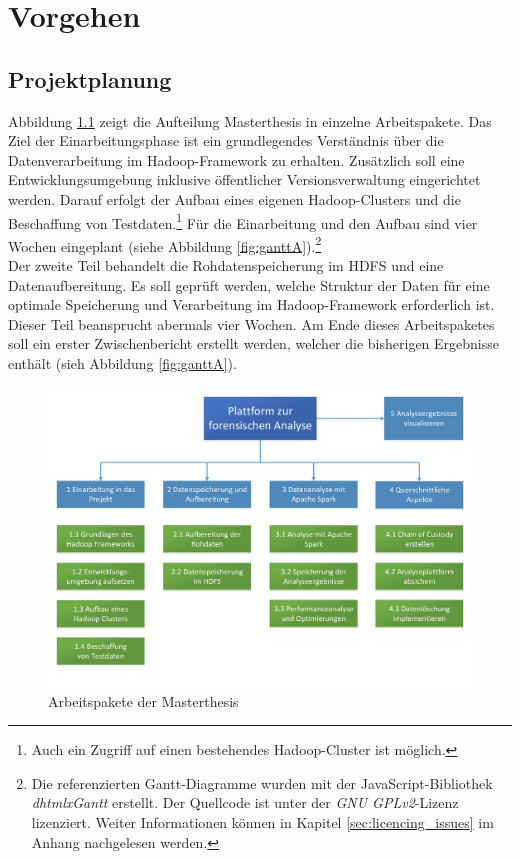 \chapter{Vorgehen}
\label{ch:development_approach}

\section{Projektplanung}
\label{sec:project_plan}
Abbildung \ref{fig:workpackages} zeigt die Aufteilung Masterthesis in einzelne Arbeitspakete. Das Ziel der Einarbeitungsphase ist ein grundlegendes Verständnis über die Datenverarbeitung im Hadoop-Framework zu erhalten. Zusätzlich soll eine Entwicklungsumgebung inklusive öffentlicher Versionsverwaltung eingerichtet werden. Darauf erfolgt der Aufbau eines eigenen Hadoop-Clusters und die Beschaffung von Testdaten.\footnote{Auch ein Zugriff auf einen bestehendes Hadoop-Cluster ist möglich.} Für die Einarbeitung und den Aufbau sind vier Wochen eingeplant (siehe Abbildung \ref{fig:ganttA}).\footnote{Die referenzierten Gantt-Diagramme wurden mit der JavaScript-Bibliothek \textit{dhtmlxGantt} erstellt. Der Quellcode ist unter der \textit{GNU GPLv2}-Lizenz lizenziert. Weiter Informationen können in Kapitel \ref{sec:licencing_issues} im Anhang nachgelesen werden.}\\

\noindent
Der zweite Teil behandelt die Rohdatenspeicherung im HDFS und eine Datenaufbereitung. Es soll geprüft werden, welche Struktur der Daten für eine optimale Speicherung und Verarbeitung im Hadoop-Framework erforderlich ist. Dieser Teil beansprucht abermals vier Wochen. Am Ende dieses Arbeitspaketes soll ein erster Zwischenbericht erstellt werden, welcher die bisherigen Ergebnisse enthält (sieh Abbildung \ref{fig:ganttA}).\\

\begin{figure}[ht]
  \centering
  \includegraphics[width=\textwidth]{./resource/Arbeitspakete.pdf}
  \caption{Arbeitspakete der Masterthesis}
  \label{fig:workpackages}
\end{figure}

